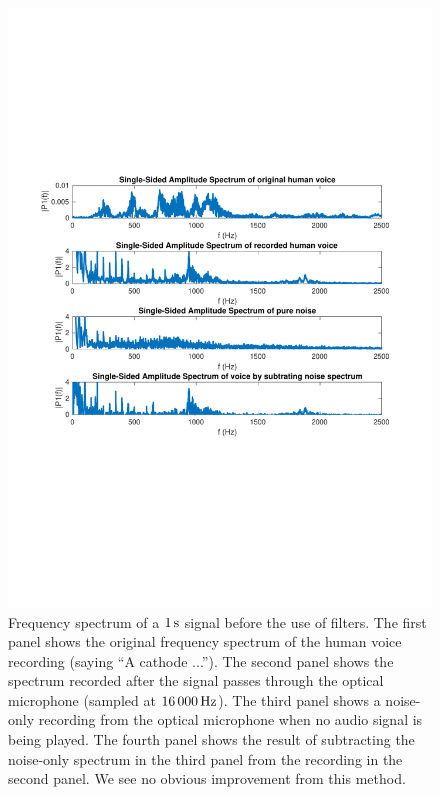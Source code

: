 \documentclass[paper-main.tex]{subfiles}
\begin{document}
\begin{figure}
\begin{center}
\includegraphics[width=\textwidth,trim={1cm 8.5cm 1cm 8cm},clip]{figures/freqSpectrumOriginalNoiseSubtracted.pdf}
\end{center}
\caption{\label{fig:noiseSubtract}
Frequency spectrum of a $1\,{\rm s}$ signal before the use of filters. 
The first panel shows the original frequency spectrum of the human voice recording (saying ``A cathode ...''). 
The second panel shows the spectrum recorded after the signal passes through the optical microphone (sampled at $16\,000\,{\rm Hz}$).
The third panel shows a noise-only recording from the optical microphone when no audio signal is being played. 
The fourth panel shows the result of subtracting the noise-only spectrum in the third panel from the recording in the second panel. 
We see no obvious improvement from this method. 
}
\end{figure}
\end{document}
